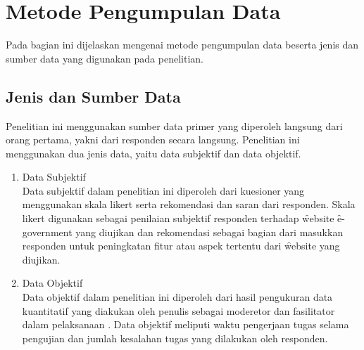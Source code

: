 \section{Metode Pengumpulan Data}
Pada bagian ini dijelaskan mengenai metode pengumpulan data beserta jenis dan sumber data yang digunakan pada penelitian.  
\subsection{Jenis dan Sumber Data}
Penelitian ini menggunakan sumber data primer yang diperoleh langsung dari orang pertama, yakni dari responden secara langsung. Penelitian ini menggunakan dua jenis data, yaitu data subjektif dan data objektif.
\begin{enumerate}
	\item Data Subjektif\\
	Data subjektif dalam penelitian ini diperoleh dari kuesioner yang menggunakan skala likert serta rekomendasi dan saran dari responden. Skala likert digunakan sebagai penilaian subjektif responden terhadap \f{website} \f{e-government} yang diujikan dan rekomendasi sebagai bagian dari masukkan responden untuk peningkatan fitur atau aspek tertentu dari \f{website} yang diujikan. 
	\item Data Objektif\\
	Data objektif dalam penelitian ini diperoleh dari hasil pengukuran data kuantitatif yang diakukan oleh penulis sebagai moderetor dan fasilitator dalam pelaksanaan \ust. Data objektif meliputi waktu pengerjaan tugas selama pengujian dan jumlah kesalahan tugas yang dilakukan oleh responden.
\end{enumerate}
